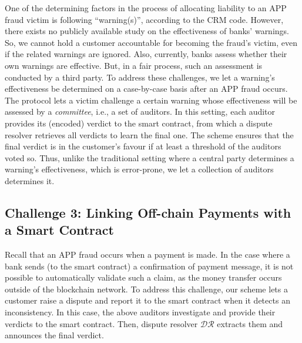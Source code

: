 One of the determining factors in the process of allocating liability to an APP fraud victim is following ``warning(s)'', according to the CRM code. However, there exists no publicly available study on the effectiveness of banks' warnings. So, we cannot hold a customer accountable for becoming the fraud's victim,  even if the related warnings are ignored. Also, currently,  banks assess whether their own warnings are effective. But, in a fair process, such an assessment is conducted by a third party.  To address these challenges, we let a warning's effectiveness be determined on a case-by-case basis after an APP fraud occurs. The protocol lets a victim challenge a certain warning whose effectiveness will be assessed by a \emph{committee}, i.e., a  set of auditors. In this setting, each auditor provides its (encoded) verdict to the smart contract, from which a dispute resolver retrieves all verdicts to learn the final one. The scheme ensures that the final verdict is in the customer's favour if at least a threshold of the auditors voted so. Thus, unlike the traditional setting where a central party determines a warning's effectiveness, which is error-prone, we let a collection of auditors determines it.





\subsection{Challenge 3: Linking Off-chain Payments with a Smart Contract}\label{sec::Linking Off-chain-Payments-with-contract}
 Recall that an APP fraud occurs when a payment is made. In the case where a  bank sends  (to the smart contract) a confirmation of payment message, it is not possible to automatically validate such a claim, as the money transfer occurs outside of the blockchain network. To address this challenge, our scheme lets a customer raise a dispute and report it to the smart contract when it detects an inconsistency. In this case, the above auditors investigate and provide their verdicts to the smart contract. Then, dispute resolver $\mathcal{DR}$ extracts them and announces the final verdict. 



